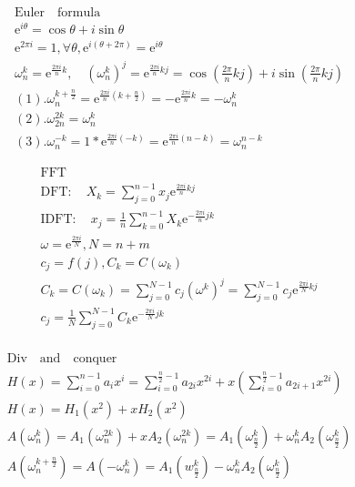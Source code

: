 \documentclass{article}
\begin{document}
\clearpage

\begin{align*}
    \mathrm{Euler \quad formula} \\
    \mathrm{e}^{i\theta} = \cos \theta + i\sin \theta\\
    \mathrm{e}^{2\pi i} = 1,\forall \theta, \mathrm{e}^{i(\theta+2\pi)} = \mathrm{e}^{i\theta}\\
    \omega_{n}^{k} = \mathrm{e}^{\frac{2\pi i}{n}k}, \quad (\omega_{n}^{k})^{j} = \mathrm{e}^{\frac{2\pi i}{n}kj} = \cos (\frac{2\pi }{n}kj) + i\sin (\frac{2\pi}{n}kj)\\
    (1). \omega_{n}^{k+\frac{n}{2}} = \mathrm{e}^{\frac{2\pi i}{n}(k+\frac{n}{2})} = -\mathrm{e}^{\frac{2\pi i}{n}k} = -\omega_{n}^{k}\\
    (2). \omega_{2n}^{2k} = \omega_{n}^{k} \\ 
    (3). \omega_{n}^{-k} = 1 * \mathrm{e}^{\frac{2\pi i}{n}(-k)} = \mathrm{e}^{\frac{2\pi i}{n}(n-k)} = \omega_{n}^{n-k}
\end{align*}

\begin{align*}
    \mathrm{FFT} \\
    \mathrm{DFT} : \quad X_{k} = \sum_{j=0}^{n-1}x_{j}\mathrm{e}^{\frac{2\pi i}{n}kj}\\
    \mathrm{IDFT} : \quad x_{j} = \frac{1}{n}\sum_{k=0}^{n-1}X_{k}\mathrm{e}^{-\frac{2\pi i}{n}jk}\\
    \omega  = \mathrm{e}^{\frac{2 \pi i}{N}}, N = n+m\\
    c_{j} = f(j), C_{k} = C(\omega_{k})\\ 
    C_{k} = C(\omega_{k}) = \sum_{j=0}^{N-1}c_{j}(\omega^{k})^{j} = \sum_{j=0}^{N-1}c_{j}\mathrm{e}^{\frac{2\pi i}{N}kj}\\
    c_{j} = \frac{1}{N}\sum_{j=0}^{N-1}C_{k}\mathrm{e}^{-\frac{2\pi i}{N}jk}\\
\end{align*}

\begin{align*}
    \mathrm{Div \quad and \quad conquer} \\
    H(x) = \sum_{i=0}^{n-1}a_{i}x^{i} = \sum_{i=0}^{\frac{n}{2}-1}a_{2i}x^{2i} + x\left(\sum_{i=0}^{\frac{n}{2}-1}a_{2i+1}x^{2i}\right)\\
    H(x) = H_{1}(x^2)+xH_{2}(x^2)\\
    A(\omega_{n}^{k}) = A_{1}(\omega_{n}^{2k}) + xA_{2}(\omega_{n}^{2k}) = A_{1}(\omega_{\frac{n}{2}}^{k}) + \omega_{n}^{k} A_{2}(\omega_{\frac{n}{2}}^{k})\\
    A(\omega_{n}^{k+\frac{n}{2}}) = A(-\omega_{n}^{k}) = A_{1}(w_{\frac{n}{2}}^{k}) - \omega_{n}^{k} A_{2}(\omega_{\frac{n}{2}}^{k})\\
\end{align*}
\end{document}
